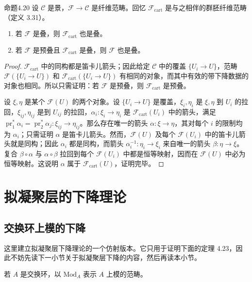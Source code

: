 \begin{origstatement}{命题}{4.20}\label{ch04:prop420}
设 $\mathcal C$ 是景，$\mathcal F\to\mathcal C$ 是纤维范畴。回忆 $\mathcal F_{\mathrm{cart}}$ 是与之相伴的群胚纤维范畴（定义 3.31）。
\begin{enumerate}
 \item[(i)] 若 $\mathcal F$ 是叠，则 $\mathcal F_{\mathrm{cart}}$ 也是叠。
 \item[(ii)] 若 $\mathcal F$ 是预叠且 $\mathcal F_{\mathrm{cart}}$ 是叠，则 $\mathcal F$ 也是叠。
\end{enumerate}
\end{origstatement}
\begin{proof}
$\mathcal F_{\mathrm{cart}}$ 中的同构都是笛卡儿箭头；因此给定 $\mathcal C$ 中的覆盖 $\{U_i\to U\}$，范畴 $\mathcal F(\{U_i\to U\})$ 和 $\mathcal F_{\mathrm{cart}}(\{U_i\to U\})$ 有相同的对象，而其中有效的带下降数据的对象也相同。所以只需证明：若 $\mathcal F$ 是预叠，则 $\mathcal F_{\mathrm{cart}}$ 是预叠。

设 $\xi,\eta$ 是某个 $\mathcal F(U)$ 的两个对象。设 $\{U_i\to U\}$ 是覆盖，$\xi_i,\eta_i$ 是 $\xi,\eta$ 到 $U_i$ 的拉回，$\xi_{ij},\eta_{ij}$ 是到 $U_{ij}$ 的拉回，$\alpha_i\colon\xi_i\to\eta_i$ 是 $\mathcal F_{\mathrm{cart}}(U_i)$ 中的箭头，满足 $\operatorname{pr}_1^*\alpha_i=\operatorname{pr}_2^*\alpha_j\colon\xi_{ij}\to\eta_{ij}$。那么存在唯一的箭头 $\alpha\colon\xi\to\eta$，其对每个 $i$ 的限制均为 $\alpha_i$；只需证明 $\alpha$ 是笛卡儿箭头。然而，$\mathcal F(U)$ 及每个 $\mathcal F(U_i)$ 中的笛卡儿箭头就是同构；因此 $\alpha_i$ 都是同构，而箭头 $\alpha_i^{-1}\colon\eta_i\to\xi_i$ 来自唯一的箭头 $\beta\colon\eta\to\xi$。复合 $\beta\circ\alpha$ 与 $\alpha\circ\beta$ 拉回到每个 $\mathcal F(U_i)$ 中都是恒等映射，因而在 $\mathcal F(U)$ 中必为恒等映射。这说明 $\alpha$ 属于 $\mathcal F_{\mathrm{cart}}(U)$，证明完毕。
\end{proof}

\section{拟凝聚层的下降理论}\label{ch04:sec42}
\subsection{交换环上模的下降}
这里建立拟凝聚层下降理论的一个仿射版本。它只用于证明下面的定理 4.23，因此不妨先读下一小节关于拟凝聚层下降的内容，然后再读本小节。

若 $A$ 是交换环，以 $\mathrm{Mod}_A$ 表示 $A$ 上模的范畴。

